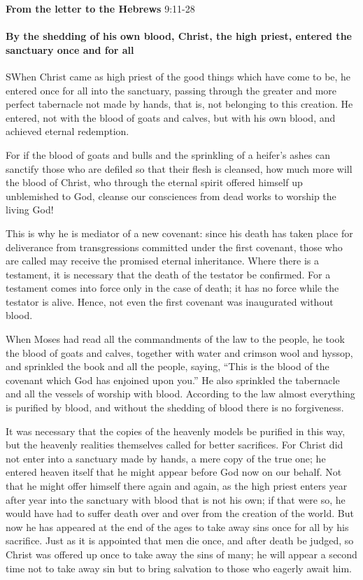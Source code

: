 \textbf{From the letter to the Hebrews} \hfill 9:11-28

\paragraph{By the shedding of his own blood, Christ, the high priest, entered the sanctuary once and for all}

\lettrine[lines=3]{S}{}When Christ came as high priest of the good things which have come to be, he entered once for all into the sanctuary, passing through the greater and more perfect tabernacle not made by hands, that is, not belonging to this creation. He entered, not with the blood of goats and calves, but with his own blood, and achieved eternal redemption.

For if the blood of goats and bulls and the sprinkling of a heifer’s ashes can sanctify those who are defiled so that their flesh is cleansed, how much more will the blood of Christ, who through the eternal spirit offered himself up unblemished to God, cleanse our consciences from dead works to worship the living God!

This is why he is mediator of a new covenant: since his death has taken place for deliverance from transgressions committed under the first covenant, those who are called may receive the promised eternal inheritance. Where there is a testament, it is necessary that the death of the testator be confirmed. For a testament comes into force only in the case of death; it has no force while the testator is alive. Hence, not even the first covenant was inaugurated without blood.

When Moses had read all the commandments of the law to the people, he took the blood of goats and calves, together with water and crimson wool and hyssop, and sprinkled the book and all the people, saying, “This is the blood of the covenant which God has enjoined upon you.” He also sprinkled the tabernacle and all the vessels of worship with blood. According to the law almost everything is purified by blood, and without the shedding of blood there is no forgiveness.

It was necessary that the copies of the heavenly models be purified in this way, but the heavenly realities themselves called for better sacrifices. For Christ did not enter into a sanctuary made by hands, a mere copy of the true one; he entered heaven itself that he might appear before God now on our behalf. Not that he might offer himself there again and again, as the high priest enters year after year into the sanctuary with blood that is not his own; if that were so, he would have had to suffer death over and over from the creation of the world. But now he has appeared at the end of the ages to take away sins once for all by his sacrifice. Just as it is appointed that men die once, and after death be judged, so Christ was offered up once to take away the sins of many; he will appear a second time not to take away sin but to bring salvation to those who eagerly await him.


